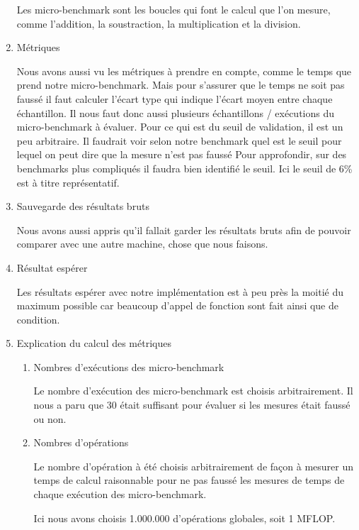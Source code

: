 \documentclass[12pt, letterpaper]{article}
\begin{document}
\begin{enumerate}
Les micro-benchmark sont les boucles qui font le calcul que l'on mesure,
comme l'addition, la soustraction, la multiplication et la division.

\item Métriques
\label{sec:org372c511}

Nous avons aussi vu les métriques à prendre en compte, comme le temps que
prend notre micro-benchmark. Mais pour s'assurer que le temps ne soit pas
faussé il faut calculer l'écart type qui indique l'écart moyen
entre chaque échantillon. Il nous faut donc aussi plusieurs échantillons
/ exécutions du micro-benchmark à évaluer. Pour ce qui est du seuil de
validation, il est un peu arbitraire. Il faudrait voir selon notre benchmark
quel est le seuil pour lequel on peut dire que la mesure n'est pas faussé
Pour approfondir, sur des benchmarks plus compliqués il faudra bien
identifié le seuil. Ici le seuil de 6\% est à titre représentatif.

\item Sauvegarde des résultats bruts
\label{sec:orga1c991d}

Nous avons aussi appris qu'il fallait garder les résultats bruts afin de
pouvoir comparer avec une autre machine, chose que nous faisons.

\item Résultat espérer
\label{sec:org7a8ec08}

Les résultats espérer avec notre implémentation est à peu près la moitié
du maximum possible car beaucoup d'appel de fonction sont fait ainsi que de
condition.

\item Explication du calcul des métriques
\label{sec:org1596888}
\begin{enumerate}
\item Nombres d'exécutions des micro-benchmark
\label{sec:org579ee88}

Le nombre d'exécution des micro-benchmark est choisis arbitrairement. Il
nous a paru que 30 était suffisant pour évaluer si les mesures était
faussé ou non.

\item Nombres d'opérations
\label{sec:org6856df3}

Le nombre d'opération à été choisis arbitrairement de façon à mesurer un
temps de calcul raisonnable pour ne pas faussé les mesures de temps de
chaque exécution des micro-benchmark.

Ici nous avons choisis 1.000.000 d'opérations globales, soit 1 MFLOP.


\end{enumerate}
\end{enumerate}
\end{document}
